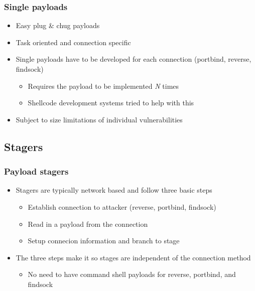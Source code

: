 \documentclass{beamer}
\newenvironment{sitemize}{\vspace{1mm}\begin{itemize}\itemsep 4pt\small}{\end{itemize}}
\begin{document}
\begin{frame}[t]
    \frametitle{Single payloads}

    \begin{sitemize}
        \item Easy plug \& chug payloads

        \pause
        \item Task oriented and connection specific

        \pause
        \item Single payloads have to be developed for each
            connection (portbind, reverse, findsock)
        \begin{sitemize}
            \item Requires the payload to be implemented \textit{N} times
        \item Shellcode development systems tried to help with this
        \end{sitemize}

        \pause
        \item Subject to size limitations of individual
        vulnerabilities
    \end{sitemize}
\end{frame}


\subsection{Stagers}
\begin{frame}[t]
    \frametitle{Payload stagers}

    \begin{sitemize}
        \item Stagers are typically network based and follow three
        basic steps
        \begin{sitemize}
            \item Establish connection to attacker (reverse,
            portbind, findsock)
            \item Read in a payload from the connection
            \item Setup connecion information and branch to stage
        \end{sitemize}

        \pause
        \item The three steps make it so stages are independent of the
    connection method
        \begin{sitemize}
            \item No need to have command shell payloads for
            reverse, portbind, and findsock
        \end{sitemize}
    \end{sitemize}
\end{frame}
\end{document}
